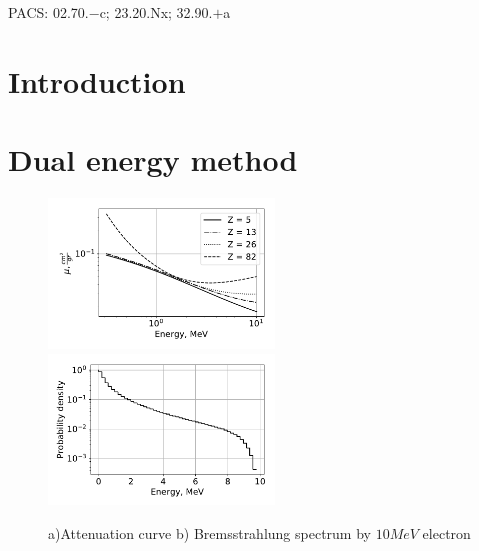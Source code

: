 \documentclass[a4paper]{panl}
\begin{document}
\noindent
PACS: 02.70.$-$c; 23.20.Nx; 32.90.$+$a

\label{sec:intro}
\section*{Introduction}
\newpage
\section*{Dual energy method}



\begin{figure}[t]
\begin{center}
\includegraphics[width=60mm]{figures/Attenuation.pdf} 
\includegraphics[width=60mm]{figures/Bremsstrahlung.pdf}  
\vspace{-3mm}
\caption{a)Attenuation curve b) Bremsstrahlung spectrum by $10 MeV$ electron}
\end{center}
\vspace{-5mm}
\end{figure}
\end{document}

